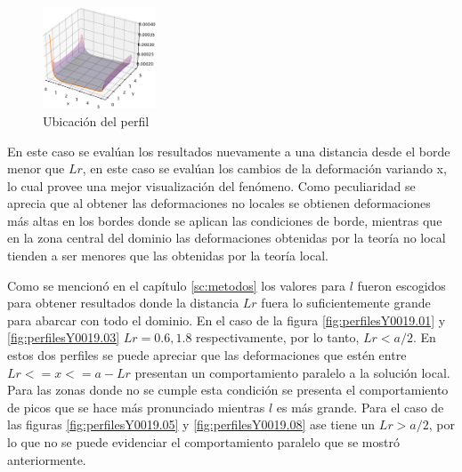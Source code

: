 	\begin{figure}
		\sffamily
		\begin{center}
			\includegraphics[width=0.3\textwidth]{figuras/Placa/defx_bonita_Y0.019.pdf}
		\end{center}
		\caption{Ubicación del perfil}
		\label{fig:defxbonitay0019}
	\end{figure}
	En este caso se evalúan los resultados nuevamente a una distancia desde el borde menor que $Lr$, en este caso se evalúan los cambios de la deformación variando x, lo cual provee una mejor visualización del fenómeno. Como peculiaridad se aprecia que al obtener las deformaciones no locales se obtienen deformaciones más altas en los bordes donde se aplican las condiciones de borde, mientras que en la zona central del dominio las deformaciones obtenidas por la teoría no local tienden a ser menores que las obtenidas por la teoría local.

	Como se mencionó en el capítulo \ref{sc:metodos} los valores para $l$ fueron escogidos para obtener resultados donde la distancia $Lr$ fuera lo suficientemente grande para abarcar con todo el dominio. En el caso de la figura \ref{fig:perfilesY0019.01} y \ref{fig:perfilesY0019.03} $Lr=0.6,1.8$ respectivamente, por lo tanto, $Lr<a/2$. En estos dos perfiles se puede apreciar que las deformaciones que estén entre $Lr<=x<=a-Lr$ presentan un comportamiento paralelo a la solución local. Para las zonas donde no se cumple esta condición se presenta el comportamiento de picos que se hace más pronunciado mientras $l$ es más grande. Para el caso de las figuras \ref{fig:perfilesY0019.05} y \ref{fig:perfilesY0019.08} ase tiene un $Lr>a/2$, por lo que no se puede evidenciar el comportamiento paralelo que se mostró anteriormente.



